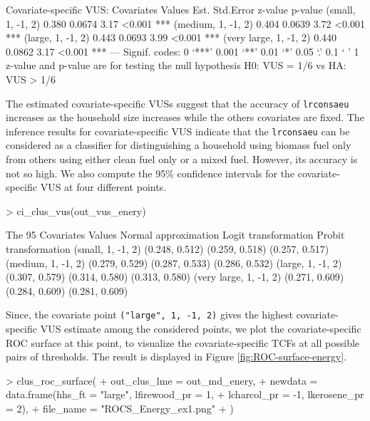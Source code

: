{\begin{example}
Covariate-specific VUS: 
      Covariates Values  Est. Std.Error z-value p-value    
      (small, 1, -1, 2) 0.380    0.0674    3.17  <0.001 ***
     (medium, 1, -1, 2) 0.404    0.0639    3.72  <0.001 ***
      (large, 1, -1, 2) 0.443    0.0693    3.99  <0.001 ***
 (very large, 1, -1, 2) 0.440    0.0862    3.17  <0.001 ***
---
Signif. codes:    0 ‘***’ 0.001 ‘**’ 0.01 ‘*’ 0.05 ‘.’ 0.1 ‘ ’ 1
z-value and p-value are for testing the null hypothesis H0: VUS = 1/6 vs HA: VUS > 1/6
\end{example}
The estimated covariate-specific VUSs suggest that the accuracy of \texttt{lrconsaeu} increases as the household size increases while the others covariates are fixed. The inference results for covariate-specific VUS indicate that the \texttt{lrconsaeu} can be considered as a classifier for distinguishing a household using biomass fuel only from others using either clean fuel only or a mixed fuel. However, its accuracy is not so high. We also compute the 95\% confidence intervals for the covariate-specific VUS at four different points.
\begin{example}
> ci_clus_vus(out_vus_enery)

The 95%
   Covariates Values  Normal approximation  Logit transformation  Probit transformation
    (small, 1, -1, 2)       (0.248, 0.512)       (0.259, 0.518)         (0.257, 0.517)
   (medium, 1, -1, 2)       (0.279, 0.529)       (0.287, 0.533)         (0.286, 0.532)
    (large, 1, -1, 2)       (0.307, 0.579)       (0.314, 0.580)         (0.313, 0.580)
(very large, 1, -1, 2)      (0.271, 0.609)       (0.284, 0.609)         (0.281, 0.609)
\end{example}

Since, the covariate point \texttt{("large", 1, -1, 2)} gives the highest covariate-specific VUS estimate among the considered points, we plot the covariate-specific ROC surface at this point, to visualize the covariate-specific TCFs at all possible pairs of thresholds. The result is displayed in Figure \ref{fig:ROC-surface-energy}.
\begin{example}
> clus_roc_surface(
+   out_clus_lme = out_md_enery,
+   newdata = data.frame(hhs_ft = "large", lfirewood_pr = 1,
+                        lcharcol_pr = -1, lkerosene_pr = 2),
+   file_name = "ROCS_Energy_ex1.png"
+ )
\end{example}

}
